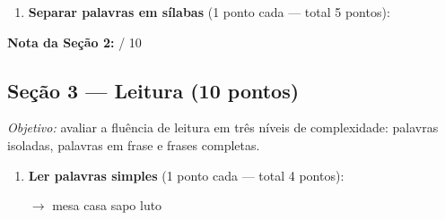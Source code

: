 \begin{avaliacao}
\begin{enumerate}[resume]
  \item \textbf{Separar palavras em sílabas} (1 ponto cada — total 5 pontos):

  \begin{center}
  \end{center}
\end{enumerate}

\medskip
\noindent\textbf{Nota da Seção 2:} \underline{\hspace{1cm}} / 10

\subsection*{Seção 3 — Leitura (10 pontos)}

\textit{Objetivo:} avaliar a fluência de leitura em três níveis de
complexidade: palavras isoladas, palavras em frase e frases completas.

\begin{enumerate}[resume]
  \item \textbf{Ler palavras simples} (1 ponto cada — total 4 pontos):

  \begin{center}
  $\rightarrow$ mesa \quad casa \quad sapo \quad luto
  \end{center}


\end{enumerate}
\end{avaliacao}
